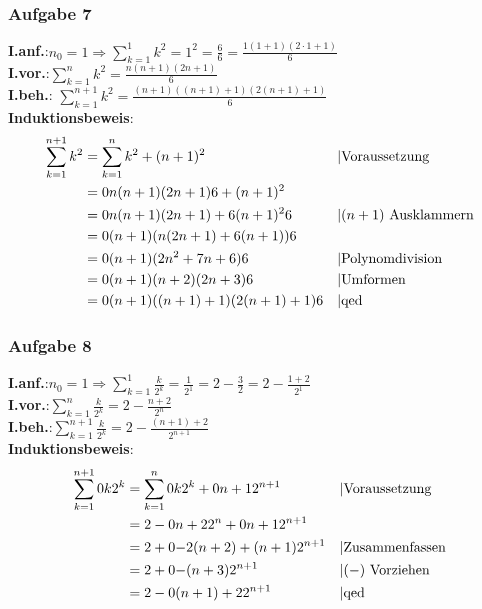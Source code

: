 \subsubsection{Aufgabe 7}
\textbf{I.anf.}:\quad $n_0 = 1 \Rightarrow \sum_{k=1}^1 k^2 = 1^2 = \frac{6}{6} = \frac{1(1+1)(2\cdot1+1)}{6} $\\
\textbf{I.vor.}:\quad $\sum_{k=1}^n k^2 = \frac{n(n+1)(2n+1)}{6} $ \\
\textbf{I.beh.}: \quad$\sum_{k=1}^{n+1} k^2 = \frac{(n+1)((n+1)+1)(2(n+1)+1)}{6} $\\
\textbf{Induktionsbeweis}: \begin{align*}
\sum_{k=1}^{n+1} k^2 &= \sum_{k=1}^n k^2 + (n+1)^2 && \text{\textbar Voraussetzung}\\
											&= \frac{n(n+1)(2n+1)}{6} + (n+1)^2 \\
											&= \frac{n(n+1)(2n+1) + 6(n+1)^2}{6} && \text{\textbar $(n+1)$ Ausklammern}\\
											&= \frac{(n+1)(n(2n+1) + 6(n+1))}{6} \\
											&= \frac{(n+1)(2n^2 + 7n + 6)}{6} && \text{\textbar Polynomdivision}\\
											&= \frac{(n+1)(n+2)(2n+3)}{6} && \text{\textbar Umformen}\\
											&= \frac{(n+1)((n+1)+1)(2(n+1)+1)}{6} && \text{\textbar qed}\end{align*}	
\subsubsection{Aufgabe 8}
\textbf{I.anf.}:\quad$ n_0 = 1 \Rightarrow \sum_{k=1}^1 \frac{k}{2^k} = \frac{1}{2^1} = 2 - \frac{3}{2} = 2 - \frac{1+2}{2^1}$\\
\textbf{I.vor.}:\quad$ \sum_{k=1}^n \frac{k}{2^k} = 2 - \frac{n+2}{2^n}$ \\
\textbf{I.beh.}:\quad$ \sum_{k=1}^{n+1} \frac{k}{2^k} = 2 - \frac{(n+1)+2}{2^{n+1}}$ \\
\textbf{Induktionsbeweis}:\begin{align*} 
\sum_{k=1}^{n+1} \frac{k}{2^k} &= \sum_{k=1}^n \frac{k}{2^k} + \frac{n+1}{2^{n+1}} && \text{\textbar Voraussetzung}\\
																&= 2 - \frac{n+2}{2^n} + \frac{n+1}{2^{n+1}} \\
																&= 2 + \frac{-2(n+2)+(n+1)}{2^{n+1}} && \text{\textbar Zusammenfassen}\\
																&= 2 + \frac{-(n+3)}{2^{n+1}} && \text{\textbar $(-)$ Vorziehen}\\
																&= 2 - \frac{(n+1)+2}{2^{n+1}} && \text{\textbar qed} \end{align*}	
